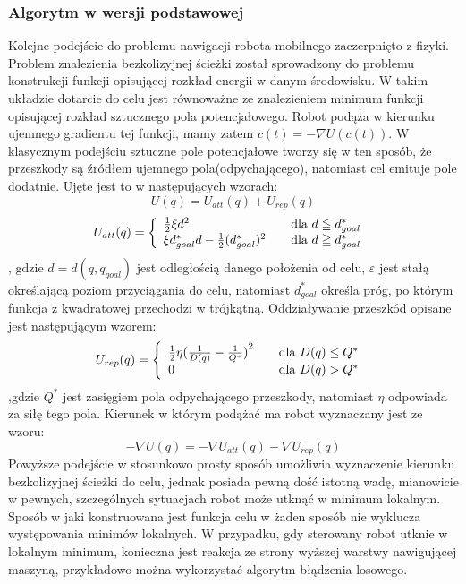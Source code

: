 \subsubsection{Algorytm w wersji podstawowej}
	Kolejne podejście do problemu nawigacji robota mobilnego zaczerpnięto z fizyki. Problem znalezienia bezkolizyjnej ścieżki został sprowadzony do problemu konstrukcji
	funkcji opisującej rozkład energii w danym środowisku. W takim układzie dotarcie do celu jest równoważne ze znalezieniem minimum funkcji opisującej rozkład sztucznego pola
	potencjałowego. Robot podąża w kierunku ujemnego gradientu tej funkcji, mamy zatem $c(t)=- \nabla U(c(t))$. W klasycznym podejściu sztuczne pole potencjałowe tworzy
	się w ten sposób, że przeszkody są źródłem ujemnego pola(odpychającego), natomiast cel emituje pole dodatnie. Ujęte jest to w następujących wzorach:
	\begin{equation}
	U(q) = U_{att}(q) + U_{rep}(q)
	\end{equation}
	\begin{equation}\label{eq:CVM_dv}
		U_{att}(q) = \left\{ 
		\begin{array}{l l}
		\frac{1}{2}\xi d^2 & \quad \mbox{dla $d\leqq d^{*}_{goal}$ }\\
		\xi d^{*}_{goal}d - \frac{1}{2}(d^{*}_{goal})^{2} & \quad \mbox{dla $d\geqq d^{*}_{goal}$ }\\
		\end{array} \right. 
	\end{equation}
	, gdzie $d=d(q,q_{goal})$ jest odległością danego położenia od celu, $\varepsilon$ jest stałą określającą poziom przyciągania do celu, natomiast $d^{*}_{goal}$ określa próg,
	po którym funkcja z kwadratowej przechodzi w trójkątną.
	Oddziaływanie przeszkód opisane jest następującym wzorem:
	\begin{equation}
		U_{rep}(q) = \left\{ 
		\begin{array}{l l}
		\frac{1}{2} \eta{ ( \frac{1}{D(q)} - \frac{1}{ Q^{*} } )}^2  & \quad \mbox{dla $D(q)\leq Q^{*} $ }\\
		0 & \quad \mbox{dla $D(q)> Q^{*}$ }\\
		\end{array} \right.
	\end{equation}
	,gdzie $ Q^{*} $ jest zasięgiem pola odpychającego przeszkody, natomiast $\eta$ odpowiada za siłę tego pola. 
	Kierunek w którym podążać ma robot wyznaczany jest ze wzoru:
	\begin{equation}
	- \nabla U(q) = - \nabla U_{att}(q) - \nabla U_{rep}(q)
	\end{equation}
	Powyższe podejście w stosunkowo prosty sposób umożliwia wyznaczenie kierunku bezkolizyjnej ścieżki do celu, jednak posiada pewną dość istotną wadę, mianowicie w pewnych, 
	szczególnych sytuacjach robot może utknąć w minimum lokalnym. Sposób w jaki konstruowana jest funkcja celu w żaden sposób nie wyklucza występowania minimów lokalnych.
	W przypadku, gdy sterowany robot utknie w lokalnym minimum, konieczna jest reakcja ze strony wyższej warstwy nawigującej maszyną, przykładowo można wykorzystać algorytm 
	błądzenia losowego.
